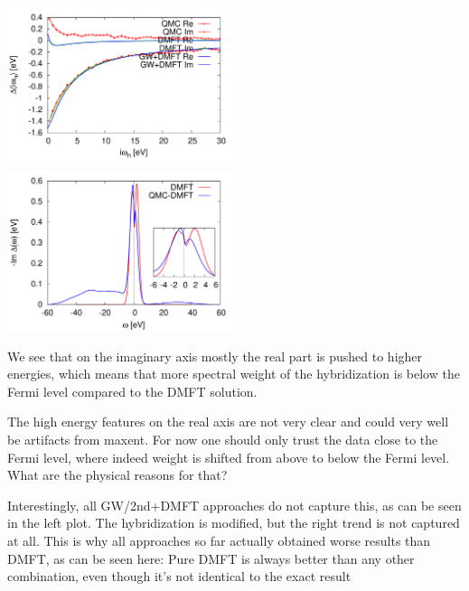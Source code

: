\documentclass[12pt,a4paper]{scrartcl}
\numberwithin{equation}{section}
\begin{document}
\includegraphics[width=0.5\textwidth]{figs/reversebath/hybrid_imag.pdf}
\includegraphics[width=0.5\textwidth]{figs/reversebath/hybrid.pdf}

We see that on the imaginary axis mostly the real part is pushed to higher energies, which means
that more spectral weight of the hybridization is below the Fermi level compared
to the DMFT solution.

The high energy features on the real axis are not very clear and could very well be artifacts from maxent.
For now one should only trust the data close to the Fermi level, where
indeed weight is shifted from above to below the Fermi level.
What are the physical reasons for that?

\bigskip

Interestingly, all GW/2nd+DMFT approaches do not capture this, as can be seen in the left plot.
The hybridization is modified, but the right trend is not captured at all.
This is why all approaches so far actually obtained worse results than DMFT, as can be seen here:
Pure DMFT is always better than any other combination, even though it's not identical to the exact result
\end{document}
